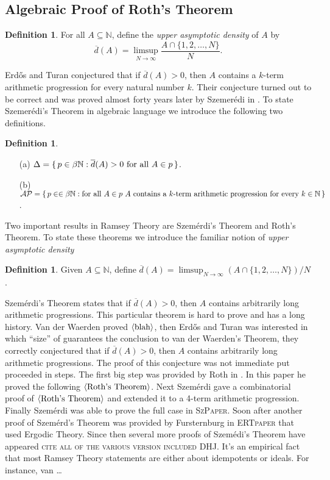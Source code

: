 \documentclass[12pt]{article}
\theoremstyle{plain}
\theoremstyle{definition}
\newtheorem{defn}[thm]{Definition}
\newcommand{\bbN}{\mathbb{N}}
\newcommand{\la}{\langle}
\newcommand{\ra}{\rangle}
\begin{document}
\subsection{Algebraic Proof of Roth's Theorem}

  \begin{defn}
    For all $A \subseteq \bbN$, define the \textsl{upper asymptotic
      density} of $A$ by 
      \[
        \overline{d}(A) = \limsup_{N\to\infty} \frac{A \cap \{1, 2,
          \ldots, N\}}{N}.
      \]
  \end{defn}

Erd\H{o}s and Turan conjectured that if $\overline{d}(A) > 0$, then
$A$ contains a $k$-term arithmetic progression for every natural
number $k$.
Their conjecture turned out to be correct and was proved almost forty
years later by Szemer\'{e}di in \cite{Szemeredi:1975uq}. 
To state Szemer\'{e}di's Theorem in algebraic language we introduce
the following two definitions.
  \begin{defn}
    \begin{itemize}
      \item[(a)] $\Delta = \{\, p \in \beta\bbN : \overline{d}(A) > 0
        \hbox{ for all } A \in p \,\}$.
      \item[(b)] $\mathcal{AP} = \{\, p \in \in \beta\bbN : \hbox{for
          all $A \in p$ } A \hbox{ contains a $k$-term arithmetic
          progression for every $k \in \bbN$} \,\}$.
    \end{itemize}
  \end{defn}

Two important results in Ramsey Theory are Szem\'{e}rdi's Theorem and
Roth's Theorem. 
To state these theorems we introduce the familiar notion of \textsl{upper
asymptotic density}
  \begin{defn}
    Given $A \subseteq \bbN$, define $\overline{d}(A) = \limsup_{N \to
      \infty} (A \cap \{1, 2, \ldots, N\})/ N$.
  \end{defn}
Szem\'{e}rdi's Theorem states that if $\overline{d}(A) > 0$, then $A$
contains arbitrarily long arithmetic progressions. 
This particular theorem is hard to prove and has a long history. 
Van der Waerden proved $\la\hbox{blah}\ra$, then Erd\H{o}s and Turan
was interested in which ``size'' of guarantees the conclusion to van
der Waerden's Theorem, they correctly conjectured that if
$\overline{d}(A) >0$, then $A$ contains arbitrarily long arithmetic
progressions. 
The proof of this conjecture was not immediate put proceeded in
steps. 
The first big step was provided by Roth in \cite{Roth:1953fk}. 
In this paper he proved the following $\la\hbox{Roth's Theorem}\ra$.
Next Szem\'{e}rdi gave a combinatorial proof of $\la\hbox{Roth's
  Theorem}\ra$ and extended it to a 4-term arithmetic progression. 
Finally Szem\'{e}rdi was able to prove the full case in
\textsc{SzPaper}. 
Soon after another proof of Szem\'{e}rd's Theorem was provided by
Fursternburg in \textsc{ERTpaper} that used Ergodic Theory. 
Since then several more proofs of Szem\'{e}di's Theorem have appeared
\textsc{cite all of the various version included DHJ}. 
It's an empirical fact that most Ramsey Theory statements are either
about idempotents or ideals.
For instance, van \dots




\end{document}
